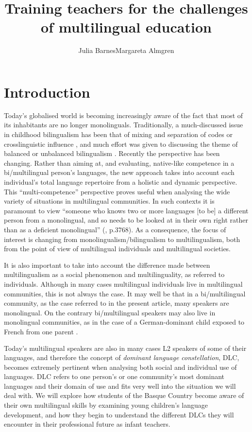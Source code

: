\documentclass[output=paper]{../langscibook}
\author{Julia Barnes\affiliation{Mondragon University}\orcid{}\lastand Margareta Almgren\affiliation{ University of the Basque Country}}
\title{Training teachers for the challenges of multilingual education}
\begin{document}
\maketitle 



 \section{Introduction}


Today’s globalised world is becoming increasingly aware of the fact that most of its inhabitants are no longer monolinguals. Traditionally, a much-discussed issue in childhood bilingualism has been that of mixing and separation of codes \citep{Meisel2001} or crosslinguistic influence \citep{Lanza1998,MullerHulk2001}, and much effort was given to discussing the theme of balanced or unbalanced bilingualism \citep{DeHouwer2009}. Recently the perspective has been changing. Rather than aiming at, and evaluating, native-like competence in a bi/multilingual person’s languages, the new approach takes into account each individual’s total language repertoire from a holistic and dynamic perspective. This “multi-competence” perspective \citep{Aronin2016} proves useful when analysing the wide variety of situations in multilingual communities. In such contexts it is paramount to view “someone who knows two or more languages  [to be] a different person from a monolingual, and so needs to be looked at in their own right rather than as a deficient monolingual” (\citealt{Cook2013}, p.3768). As a consequence, the focus of interest is changing from monolingualism/bilingualism to multilingualism, both from the point of view of multilingual individuals and multilingual societies. 

It is also important to take into account the difference made between multilingualism as a social phenomenon and multilinguality, as referred to individuals. Although in many cases multilingual individuals live in multilingual communities, this is not always the case. It may well be that in a bi/multilingual community, as the case referred to in the present article, many speakers are monolingual. On the contrary bi/multilingual speakers may also live in monolingual communities, as in the case of a German-dominant child exposed to French from one parent \citep{Meisel2008}.

Today’s multilingual speakers are also in many cases L2 speakers of some of their languages, and therefore the concept of \emph{dominant language constellation}, DLC, \citep{Aronin2016} becomes extremely pertinent when analysing both social and individual use of languages. DLC refers to one person’s or one community’s most dominant languages and their domain of use and fits very well into the situation we will deal with. We will explore how students of the Basque Country become aware of their own multilingual skills by examining young children’s language development, and how they begin to understand the different DLCs they will encounter in their professional future as infant teachers.
\end{document}
